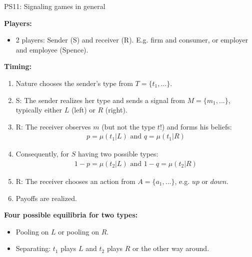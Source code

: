 \begin{frame}{PS11: Signaling games in general}
    \begin{multicols}{2}
      \textbf{Players:}\vspace{-10pt}
      \begin{itemize}
        \item 2 players: Sender (S) and receiver (R). E.g. firm and consumer, or employer and employee (Spence).
      \end{itemize}\vspace{-8pt}
      \textbf{Timing:}\vspace{-10pt}
      \begin{enumerate}
        \item Nature chooses the sender's type from $T=\{t_1,...\}$.
        \item \vspace{-4pt} S: The sender realizes her type and sends a signal from $M=\{m_1,...\}$, typically either $L$ (left) or $R$ (right).
        \item \vspace{-4pt} R: The receiver observes $m$ (but not the type $t$!) and forms his beliefs:\vspace{-8pt}
        \begin{align*}
          p=\mu(t_1|L)\text{ and }q=\mu(t_1|R)
        \end{align*}
        \item[] \vspace{-8pt} Consequently, for $S$ having two possible types:\vspace{-8pt}
        \begin{align*}
          1-p=\mu(t_2|L)\text{ and }1-q=\mu(t_2|R)
        \end{align*}
        \item \vspace{-8pt} R: The receiver chooses an action from $A=\{a_1,...\}$, e.g. $up$ or $down$.
        \item \vspace{-4pt} Payoffs are realized.
      \end{enumerate}\vspace{-8pt}
      \textbf{Four possible equilibria for two types:}\vspace{-8pt}
      \begin{itemize}
        \item Pooling on $L$ or pooling on $R$.
        \item \vspace{-4pt} Separating: $t_1$ plays $L$ and $t_2$ plays $R$ or the other way around.

\end{itemize}
\end{multicols}
\end{frame}
